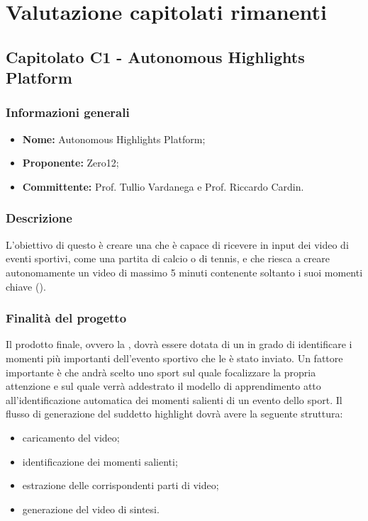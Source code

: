 \section{Valutazione capitolati rimanenti}
    \subsection{Capitolato C1 - Autonomous Highlights Platform}
       \subsubsection{Informazioni generali}
       \begin{itemize}
           \item \textbf{Nome:} Autonomous Highlights Platform;
           \item \textbf{Proponente: }Zero12;
           \item \textbf{Committente: }Prof. Tullio Vardanega e Prof. Riccardo Cardin.
       \end{itemize}

    \subsubsection{Descrizione}
        L'obiettivo di questo  è creare una  che è capace di ricevere in input dei video di eventi sportivi, come una partita di calcio o di tennis, e che riesca a creare autonomamente un video di massimo 5 minuti contenente soltanto i suoi momenti chiave ().

    \subsubsection{Finalità del progetto}
        Il prodotto finale, ovvero la , dovrà essere dotata di un  in grado di identificare i momenti più importanti dell'evento sportivo che le è stato inviato. Un fattore importante è che andrà scelto uno sport sul quale focalizzare la propria attenzione e sul quale verrà addestrato il modello di apprendimento atto all'identificazione automatica dei momenti salienti di un evento dello sport.
        Il flusso di generazione del suddetto highlight dovrà avere la seguente struttura:
        \begin{itemize}
            \item caricamento del video;
            \item identificazione dei momenti salienti;
            \item estrazione delle corrispondenti parti di video;
            \item generazione del video di sintesi.
        \end{itemize}
